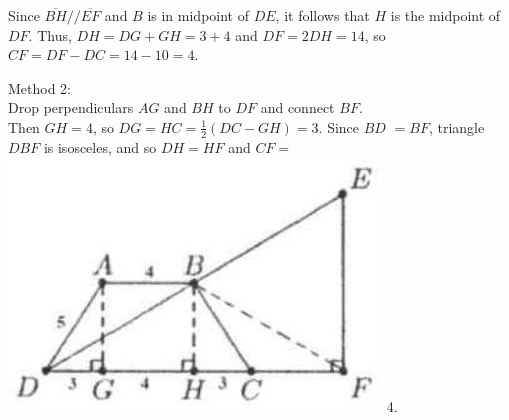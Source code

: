 \documentclass{article}
\begin{document}
Since \(\overline{B H} / / \overline{E F}\) and \(B\) is in midpoint of \(D E\), it follows that \(H\) is the midpoint of \(D F\). Thus, \(D H=D G+G H=3+4\) and \(D F=2 D H=14\), so \(C F=D F-D C=14-10=4\).

Method 2:\\
Drop perpendiculars \(A G\) and \(B H\) to \(D F\) and connect \(B F\).\\
Then \(G H=4\), so \(D G=H C=\frac{1}{2}(D C-G H)=3\). Since \(B D\) \(=B F\), triangle \(D B F\) is isosceles, and so \(D H=H F\) and \(C F=\)\\
\includegraphics[width=\textwidth]{images/077(2).jpg} 4.
\end{document}
